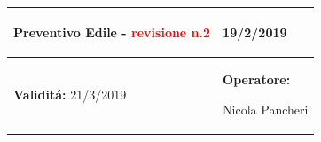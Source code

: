 \documentclass[a4paper]{article}
\begin{document}
                                  \begin{center}
                                  \begin{tabular}{|L{89mm} R{60mm}| }
                                  \hline
                                  \vspace{2.5mm}
                                  \begin{spacing}{0}
                                \textbf{Preventivo Edile - } \textcolor{red}{revisione n.2}
                                  \end{spacing}&
                                  \vspace{2.5mm}
                                  \begin{spacing}{0}

                                19/2/2019

                                  \end{spacing}\\
                                  \hline
                                  \vspace{2.5mm}
                                  \begin{spacing}{0}

                                
                                        \textbf{Validit\'a:}
                                   21/3/2019
                                  \end{spacing} &
                                  \vspace{2.5mm}
                                  \begin{spacing}{0}
                                    \textbf{Operatore:}

                               Nicola Pancheri
                                  \end{spacing} \\
                                  \hline
                                  \end{tabular}
                                  \end{center}
                               
\end{document}
